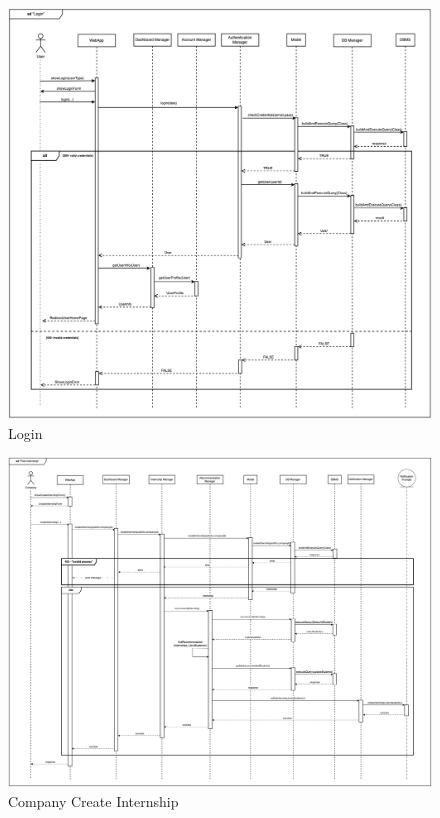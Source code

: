 \documentclass[a4paper,12pt]{article}
\begin{document}
\begin{figure}[H]
    \centering
    \includegraphics[scale = 0.35]{DD_figures/SingleDiagrams/login.drawio.png}
    \caption{Login}
    \centering
\end{figure}

\begin{figure}[H]
    \centering
    \includegraphics[scale = 0.25]{DD_figures/SingleDiagrams/postInternship.drawio.png}
    \caption{Company Create Internship}
    \centering
\end{figure}
\newpage
\end{document}

